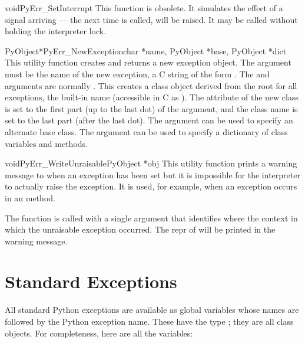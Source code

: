 \documentclass{manual}
\begin{document}
\begin{cfuncdesc}{void}{PyErr_SetInterrupt}{}
This function is obsolete.  It simulates the effect of a
 signal arriving --- the next time
 is called,
 will be raised.
It may be called without holding the interpreter lock.
\end{cfuncdesc}

\begin{cfuncdesc}{PyObject*}{PyErr_NewException}{char *name,
                                                 PyObject *base,
                                                 PyObject *dict}
This utility function creates and returns a new exception object.  The
 argument must be the name of the new exception, a C string
of the form .  The  and
 arguments are normally \NULL{}.  This creates a
class object derived from the root for all exceptions, the built-in
name  (accessible in C as
).  The  attribute of the
new class is set to the first part (up to the last dot) of the
 argument, and the class name is set to the last part (after
the last dot).  The  argument can be used to specify an
alternate base class.  The  argument can be used to specify
a dictionary of class variables and methods.
\end{cfuncdesc}

\begin{cfuncdesc}{void}{PyErr_WriteUnraisable}{PyObject *obj}
This utility function prints a warning message to 
when an exception has been set but it is impossible for the
interpreter to actually raise the exception.  It is used, for example,
when an exception occurs in an  method.

The function is called with a single argument  that
identifies where the context in which the unraisable exception
occurred.  The repr of  will be printed in the warning
message.
\end{cfuncdesc}

\section{Standard Exceptions \label{standardExceptions}}

All standard Python exceptions are available as global variables whose
names are  followed by the Python exception name.  These
have the type ; they are all class objects.  For
completeness, here are all the variables:
\end{document}
